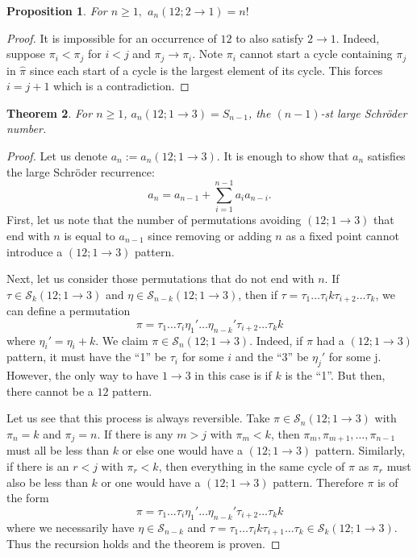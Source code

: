 \documentclass[11pt]{article}
\renewcommand\S{\mathcal S}
\newtheorem{theorem}{Theorem}[section]
\newtheorem{proposition}[theorem]{Proposition}
\theoremstyle{definition}
\begin{document}
\begin{proposition} \label{prop:12t21} 
    For $n\geq 1,$
    $a_n(12; 2 \to 1) = n!$
\end{proposition}

\begin{proof}
    It is impossible for an occurrence of $12$ to also satisfy $2 \to 1$. Indeed, suppose $\pi_i < \pi_j$ for $i < j$ and $\pi_j \to \pi_i$. Note $\pi_i$ cannot start a cycle containing $\pi_j$ in $\hat\pi$ since each start of a cycle is the largest element of its cycle. This forces $i = j+1$ which is a contradiction. 
\end{proof}

\begin{theorem} \label{thm:12t13}
    For $n\geq 1$, 
    $a_n(12;1\to3)=S_{n-1}$, the $(n-1)$-st large Schr\"oder number.
\end{theorem}

\begin{proof}
    Let us denote $a_n:=a_n(12; 1\to 3)$. It is enough to show that $a_n$ satisfies the large Schr\"oder recurrence: 
      \[
    a_n = a_{n-1} + \sum_{i=1}^{n-1} a_i a_{n-i}.
    \]
    First, let us note that the number of permutations avoiding $(12;1\to 3)$ that end with $n$ is equal to $a_{n-1}$ since removing or adding $n$ as a fixed point cannot introduce a $(12;1\to3)$ pattern. 
    
     Next, let us consider those permutations that do not end with $n$. If $\tau\in \S_k(12;1\to 3)$ and $\eta \in \S_{n-k}(12;1\to 3)$, then if $\tau = \tau_1\ldots \tau_i k \tau_{i+2}\ldots \tau_k$, we can define a permutation \[\pi = \tau_1\ldots \tau_i \eta_1'\ldots \eta_{n-k}' \tau_{i+2}\ldots \tau_k k\] where $\eta_i' = \eta_i + k.$ We claim $\pi \in \S_n(12;1\to 3).$  Indeed, if $\pi$ had a $(12;1\to 3)$ pattern, it must have the ``1'' be $\tau_i$ for some $i$ and the ``3'' be $\eta_j'$ for some j. However, the only way to have $1\to3$ in this case is if $k$ is the ``1''. But then, there cannot be a $12$ pattern. 
     
     Let us see that this process is always reversible. Take $\pi\in\S_n(12;1\to 3)$ with $\pi_n=k$ and $\pi_j=n$. If there is any $m>j$ with $\pi_m<k$, then $\pi_m,\pi_{m+1}, \ldots, \pi_{n-1}$ must all be less than $k$ or else one would have a $(12;1\to3)$ pattern. Similarly, if there is an $r<j$ with $\pi_r<k$, then everything in the same cycle of $\hat\pi$ as $\pi_r$ must also be less than $k$ or one would have a $(12;1\to3)$ pattern. Therefore $\pi$ is of the form \[\pi = \tau_1\ldots \tau_i \eta_1'\ldots \eta_{n-k}' \tau_{i+2}\ldots \tau_k k\] where we necessarily have $\eta\in\S_{n-k}$ and $\tau = \tau_1\ldots \tau_{i}k\tau_{i+1}\ldots\tau_{k}\in\S_k(12;1\to3).$ Thus the recursion holds and the theorem is proven.
\end{proof}
\end{document}
